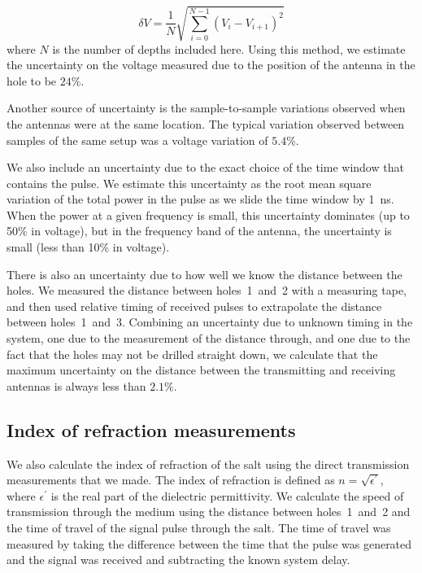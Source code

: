 \documentclass{elsart}
\begin{document}
  \begin{equation}
    \delta V = \frac{1}{N} \sqrt{\sum_{i=0}^{N-1} (V_{i}-V_{i+1})^2} 
  \end{equation}
  where $N$ is the number of depths included here. Using this method, 
  we estimate the uncertainty on the voltage measured due to the position of the antenna 
  in the hole to be $24\%$.
  
  Another source of uncertainty is the sample-to-sample variations observed when the 
  antennas were at the same location.  The typical variation observed between samples of the same 
  setup was a voltage variation of $5.4\%$.
  
  We also include an uncertainty due to the exact choice of the time window that contains the pulse.  
  We estimate this uncertainty as the root mean square variation 
  of the total power in the pulse as we slide 
  the time window by 1~ns.  When the power at a given frequency is small, 
  this uncertainty dominates (up to 50\% in voltage), but 
  in the frequency band of the antenna, the uncertainty is small (less than 10\% in voltage).
  
  There is also an uncertainty due to how well we know the distance between the holes.  We 
  measured the distance between holes~1~and~2 with a measuring tape, and then used relative 
  timing of received pulses to extrapolate the distance between holes~1~and~3.  
  Combining an uncertainty due to unknown 
  timing in the system, one due to the measurement of the distance through, and one  
  due to the fact that the holes may not be drilled straight down, 
  we calculate that the maximum uncertainty on the distance between the transmitting and receiving 
  antennas is always less than $2.1\%$.

  \subsection{Index of refraction measurements}
  We also calculate the index of refraction of the salt using the direct transmission
  measurements that we made.  The index of refraction is defined as $n=\sqrt{\epsilon^\prime}$, 
  where $\epsilon^\prime$ is the real part of the dielectric permittivity.  We calculate 
  the speed of transmission through the medium using the distance between holes~1~and~2 and 
  the time of travel of the signal pulse through the salt.  The time of travel was measured 
  by taking the difference between the time that the pulse was generated and the signal was 
  received and subtracting the known system delay.
  
\end{document}

